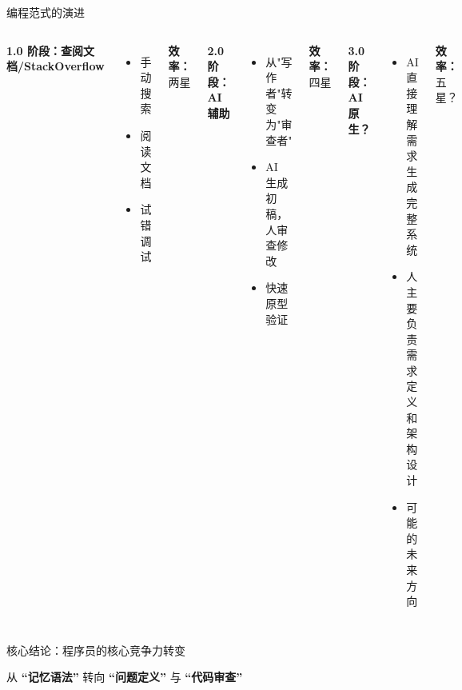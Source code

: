 \begin{frame}{编程范式的演进}
	\small
	\begin{columns}
		\textbf{1.0 阶段：查阅文档/StackOverflow}
		\begin{itemize}
			\item 手动搜索
			\item 阅读文档
			\item 试错调试
		\end{itemize}
		\textbf{效率：}两星

		\textbf{2.0 阶段：AI 辅助}
		\begin{itemize}
			\item 从"写作者"转变为"审查者"
			\item AI 生成初稿，人审查修改
			\item 快速原型验证
		\end{itemize}
		\textbf{效率：}四星

		\textbf{3.0 阶段：AI 原生？}
		\begin{itemize}
			\item AI 直接理解需求生成完整系统
			\item 人主要负责需求定义和架构设计
			\item 可能的未来方向
		\end{itemize}
		\textbf{效率：}五星？
	\end{columns}

	\vspace{0.5cm}

	\begin{block}{核心结论：程序员的核心竞争力转变}
		\begin{center}
			\Large 从 \textbf{``记忆语法''} 转向 \textbf{``问题定义''} 与 \textbf{``代码审查''}
		\end{center}
	\end{block}
\end{frame}
